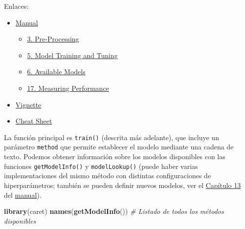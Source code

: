 \documentclass[]{book}
\newenvironment{Shaded}{\begin{snugshade}}{\end{snugshade}}
\newcommand{\KeywordTok}[1]{\textcolor[rgb]{0.13,0.29,0.53}{\textbf{#1}}}
\newcommand{\CommentTok}[1]{\textcolor[rgb]{0.56,0.35,0.01}{\textit{#1}}}
\newcommand{\NormalTok}[1]{#1}
\theoremstyle{break}
\theoremstyle{definition}
\theoremstyle{definition}
\theoremstyle{definition}
\theoremstyle{remark}
\begin{document}
Enlaces:

\begin{itemize}
\item
  \href{https://topepo.github.io/caret}{Manual}

  \begin{itemize}
  \item
    \href{https://topepo.github.io/caret/pre-processing.html}{3.
    Pre-Processing}
  \item
    \href{https://topepo.github.io/caret/model-training-and-tuning.html}{5.
    Model Training and Tuning}
  \item
    \href{https://topepo.github.io/caret/available-models.html}{6.
    Available Models}
  \item
    \href{https://topepo.github.io/caret/measuring-performance.html}{17.
    Measuring Performance}
  \end{itemize}
\item
  \href{https://cran.r-project.org/web/packages/caret/vignettes/caret.html}{Vignette}
\item
  \href{https://raw.githubusercontent.com/rstudio/cheatsheets/master/caret.pdf}{Cheat
  Sheet}
\end{itemize}

La función principal es \texttt{train()} (descrita más adelante), que
incluye un parámetro \texttt{method} que permite establecer el modelo
mediante una cadena de texto. Podemos obtener información sobre los
modelos disponibles con las funciones \texttt{getModelInfo()} y
\texttt{modelLookup()} (puede haber varias implementaciones del mismo
método con distintas configuraciones de hiperparámetros; también se
pueden definir nuevos modelos, ver el
\href{https://topepo.github.io/caret/using-your-own-model-in-train.html}{Capítulo
13} del \href{https://topepo.github.io/caret}{manual}).

\begin{Shaded}
\begin{Highlighting}[]
\KeywordTok{library}\NormalTok{(caret)}
\KeywordTok{names}\NormalTok{(}\KeywordTok{getModelInfo}\NormalTok{()) }\CommentTok{# Listado de todos los métodos disponibles}
\end{Highlighting}
\end{Shaded}
\end{document}
